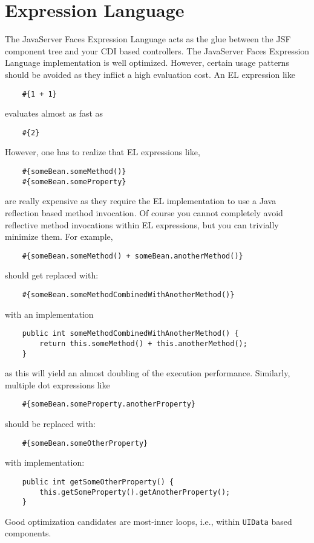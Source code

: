 \section{Expression Language}
The JavaServer Faces Expression Language acts as the glue between the JSF component tree and your CDI based controllers.
The JavaServer Faces Expression Language implementation is well optimized.
However, certain usage patterns should be avoided as they inflict a high evaluation cost.
An EL expression like
\begin{lstlisting}
	#{1 + 1}
\end{lstlisting}
evaluates almost as fast as
\begin{lstlisting}
	#{2}
\end{lstlisting}
However, one has to realize that EL expressions like,
\begin{lstlisting}
	#{someBean.someMethod()}
	#{someBean.someProperty}
\end{lstlisting}
are really expensive as they require the EL implementation to use a Java reflection based method invocation.
Of course you cannot completely avoid reflective method invocations within EL expressions, but you can trivially minimize them.
For example,
\begin{lstlisting}
	#{someBean.someMethod() + someBean.anotherMethod()}
\end{lstlisting}
should get replaced with:
\begin{lstlisting}
	#{someBean.someMethodCombinedWithAnotherMethod()}
\end{lstlisting}
with an implementation
\begin{lstlisting}
	public int someMethodCombinedWithAnotherMethod() {
		return this.someMethod() + this.anotherMethod();
	}
\end{lstlisting}
as this will yield an almost doubling of the execution performance.
Similarly, multiple dot expressions like
\begin{lstlisting}
	#{someBean.someProperty.anotherProperty}
\end{lstlisting}
should be replaced with:
\begin{lstlisting}
	#{someBean.someOtherProperty}
\end{lstlisting}
with implementation:
\begin{lstlisting}
	public int getSomeOtherProperty() {
		this.getSomeProperty().getAnotherProperty();
	}
\end{lstlisting}
Good optimization candidates are most-inner loops, i.e., within \texttt{UIData} based components.


